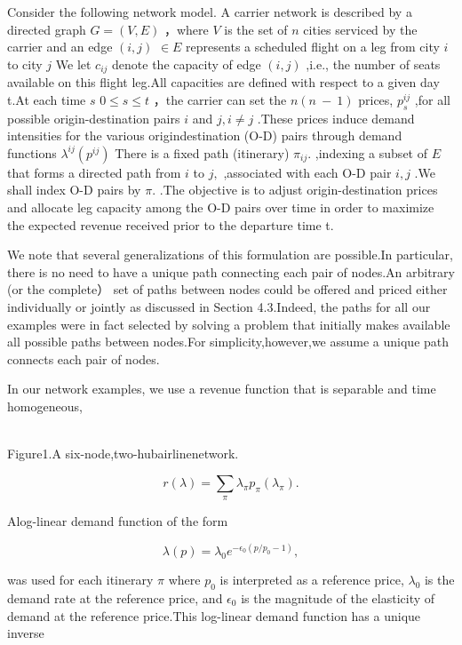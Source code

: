 Consider the following network model. A carrier network is described by
a directed graph \(G = ( V , E )\) ，where \(V\) is the set of \(n\)
cities serviced by the carrier and an edge \(( i , j )\) \(\in E\)
represents a scheduled flight on a leg from city \(i\) to city \(j\) We
let \(c _ { i j }\) denote the capacity of edge \(( i , j )\) ,i.e., the
number of seats available on this flight leg.All capacities are defined
with respect to a given day t.At each time \(s\)
\(0 \leqslant s \leqslant t\) ，the carrier can set the
\(n ( n \mathrm { ~ - ~ } 1 )\) prices, \(p _ { s } ^ { i j }\) ,for all
possible origin-destination pairs \(i\) and \(j , i \neq j\) .These
prices induce demand intensities for the various origindestination (O-D)
pairs through demand functions \(\lambda ^ { i j } ( p ^ { i j } )\)
There is a fixed path (itinerary) \(\pi _ { i j } .\) ,indexing a subset
of \(E\) that forms a directed path from \(i\) to \(j ,\) ,associated
with each O-D pair \(i , j\) .We shall index O-D pairs by \(\pi .\) .The
objective is to adjust origin-destination prices and allocate leg
capacity among the O-D pairs over time in order to maximize the expected
revenue received prior to the departure time t.

We note that several generalizations of this formulation are possible.In
particular, there is no need to have a unique path connecting each pair
of nodes.An arbitrary (or the complete） set of paths between nodes
could be offered and priced either individually or jointly as discussed
in Section 4.3.Indeed, the paths for all our examples were in fact
selected by solving a problem that initially makes available all
possible paths between nodes.For simplicity,however,we assume a unique
path connects each pair of nodes.

In our network examples, we use a revenue function that is separable and
time homogeneous,

\\
Figure1.A six-node,two-hubairlinenetwork.

\[
r ( \lambda ) = \sum _ { \pi } \lambda _ { \pi } p _ { \pi } ( \lambda _ { \pi } ) .
\]

Alog-linear demand function of the form

\[
\lambda ( p ) = \lambda _ { 0 } e ^ { - \epsilon _ { 0 } ( p / p _ { 0 } - 1 ) } ,
\]

was used for each itinerary \(\pi\) where \(p _ { 0 }\) is interpreted
as a reference price, \(\lambda _ { 0 }\) is the demand rate at the
reference price, and \(\epsilon _ { 0 }\) is the magnitude of the
elasticity of demand at the reference price.This log-linear demand
function has a unique inverse

